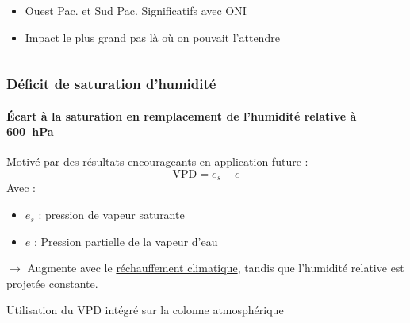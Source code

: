 \documentclass[aspectratio=169, usepdftitle=false, xcolor={dvipsnames}, 9pt,table]{beamer}
\begin{document}
\begin{frame}[t]
\begin{columns}
\begin{column}{0.2\textwidth}
\begin{block}
                \begin{itemize}
                    \item Ouest Pac. et Sud Pac. Significatifs avec ONI 
                    \item Impact le plus grand pas là où on pouvait l'attendre
                \end{itemize}
            \end{block}
        \end{column}
    \end{columns}
\end{frame}

\begin{frame}
    \frametitle{Déficit de saturation d'humidité}
    \framesubtitle{Écart à la saturation en remplacement de l'humidité relative à 600~hPa}
    \small
    \begin{definition}
        \footnotesize
        Motivé par des résultats encourageants en application future \parencite{camargo_testing_2014}:\\
        \[ \text{VPD} = e_s - e \]
        Avec :
        \setlength{\leftmargini}{2.5ex}
        \begin{itemize}
            \item $e_s$ : pression de vapeur saturante
            \item $e$ : Pression partielle de la vapeur d'eau
        \end{itemize}
        $\longrightarrow$ \alert{Augmente} avec le \underline{réchauffement climatique}, tandis que l'humidité relative est projetée constante.\\
        \vspace{\baselineskip}
    \end{definition}
    \vspace{1em}
    \small
    \begin{examples}[Méthodologie]
        \footnotesize
        Utilisation du VPD intégré sur la colonne atmosphérique \parencite{camargo_testing_2014}
    \end{examples}
\end{frame}
\end{document}
